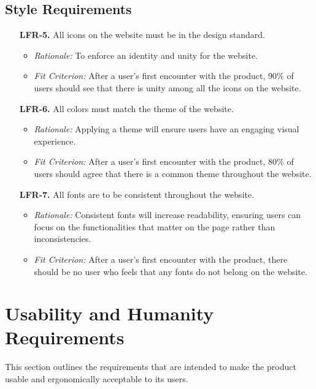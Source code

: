 \documentclass[12pt]{article}
\begin{document}
\subsection{Style Requirements}
\begin{enumerate}
  \item[\textbf{LFR-5.}] All icons on the website must be in the design standard. 
  \begin{itemize}
    \item \textit{Rationale:} To enforce an identity and unity for the website. 
    \item \textit{Fit Criterion:} After a user's first encounter with the product, 90\% of users should
    see that there is unity among all the icons on the website. 
  \end{itemize}
  
  \item[\textbf{LFR-6.}] All colors must match the theme of the website.
  \begin{itemize}
    \item \textit{Rationale:} Applying a theme will ensure users have
    an engaging visual experience.
    \item \textit{Fit Criterion:} After a user's first encounter with the product, 80\% of users
    should agree that there is a common theme throughout the website.
  \end{itemize}
  
  \item[\textbf{LFR-7.}] All fonts are to be consistent throughout the website. 
  \begin{itemize}
    \item \textit{Rationale:} Consistent fonts will increase readability,
    ensuring users can focus on the functionalities that matter on the page rather than inconsistencies. 
    \item \textit{Fit Criterion:} After a user's first encounter with the product, there should
    be no user who feels that any fonts do not belong on the website. 
  \end{itemize}
\end{enumerate}

\section{Usability and Humanity Requirements}
This section outlines the requirements that are intended to make the product usable and ergonomically acceptable to its users.
\end{document}
